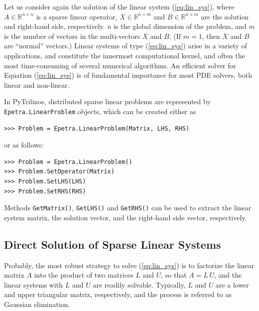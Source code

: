 \documentclass[10pt,relax]{SANDreport}
\newcommand{\PyTrilinos}{{PyTrilinos}}
\begin{document}
Let us consider again the solution of the linear system (\ref{eq:lin_sys}),
where $A \in \mathbb{R}^{n \times n}$ is a sparse linear operator, $X \in
\mathbb{R}^{n \times m}$ and $B \in \mathbb{R}^{n \times m}$ are the solution
and right-hand side, respectively. $n$ is the global dimension of the problem,
  and $m$ is the number of vectors in the multi-vectors $X$ and $B$. 
  (If $m = 1$, then $X$ and $B$ are ``normal'' vectors.)
Linear systems of type (\ref{eq:lin_sys}) arise in a variety of applications,
  and constitute the innermost computational kernel, and often the most
  time-consuming of several numerical algorithms. An efficient solver for
  Equation (\ref{eq:lin_sys}) is of fundamental importance for most PDE
  solvers, both linear and non-linear.

In \PyTrilinos, distributed sparse linear problems are represented by {\tt
  Epetra.LinearProblem} objects, which can be created either as
\begin{verbatim}
>>> Problem = Epetra.LinearProblem(Matrix, LHS, RHS)
\end{verbatim}
or as follows:
\begin{verbatim}
>>> Problem = Epetra.LinearProblem()
>>> Problem.SetOperator(Matrix)
>>> Problem.SetLHS(LHS)
>>> Problem.SetRHS(RHS)
\end{verbatim}
Methods \verb!GetMatrix()!, \verb!GetLHS()! and \verb!GetRHS()! can be used to
extract the linear system matrix, the solution vector, and the right-hand side
vector, respectively.

\subsection{Direct Solution of Sparse Linear Systems}
\label{sec:direct}

Probably, the most robust strategy to solve (\ref{eq:lin_sys}) is to factorize
the linear matrix $A$ into the product of two matrices $L$ and $U$, so that
$A = L \, U$, and 
the linear systems with $L$ and $U$ are readily solvable. Typically,
$L$ and $U$ are a lower and upper triangular matrix, respectively, and the
process is referred to as Gaussian elimination. 
\end{document}
